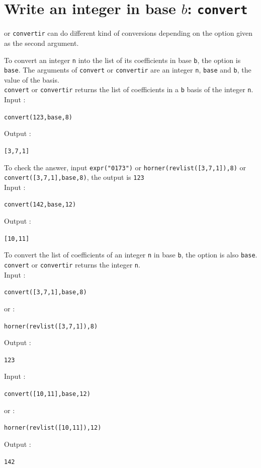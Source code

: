 \documentclass[a4paper,11pt]{book}
\begin{document}
\section{Write an integer in base $b$: {\tt convert}}
\label{sec:convertbase}
 or {\tt convertir} can do different kind
of conversions depending on the option given as the second argument.

To convert an integer {\tt n} into the list of its coefficients in
base {\tt b}, the option is {\tt base}. The arguments of {\tt convert} or 
{\tt convertir} are an integer {\tt n}, {\tt base} and {\tt b}, the value of the
 basis.\\
{\tt convert} or {\tt convertir} returns the list of coefficients in a {\tt b} 
basis of the integer {\tt n}.\\
Input :
\begin{center}{\tt convert(123,base,8)}\end{center}
Output :
\begin{center}{\tt [3,7,1]}\end{center}
To check the answer, 
input {\tt expr("0173")} or  {\tt horner(revlist([3,7,1]),8)}
or {\tt convert([3,7,1],base,8)}, the output is {\tt 123}\\
Input :
\begin{center}{\tt convert(142,base,12)}\end{center}
Output :
\begin{center}{\tt [10,11]}\end{center}

To convert the list of coefficients of an integer {\tt n} in base {\tt b},
the option is also {\tt base}. 
{\tt convert} or {\tt convertir} returns the integer {\tt n}.\\ 
Input :
\begin{center}{\tt convert([3,7,1],base,8)}\end{center}
or :
\begin{center}{\tt horner(revlist([3,7,1]),8)}\end{center}
Output :
\begin{center}{\tt 123}\end{center}
Input :
\begin{center}{\tt convert([10,11],base,12)}\end{center}
or :
\begin{center}{\tt horner(revlist([10,11]),12)}\end{center}
Output :
\begin{center}{\tt 142}\end{center}
\end{document}
